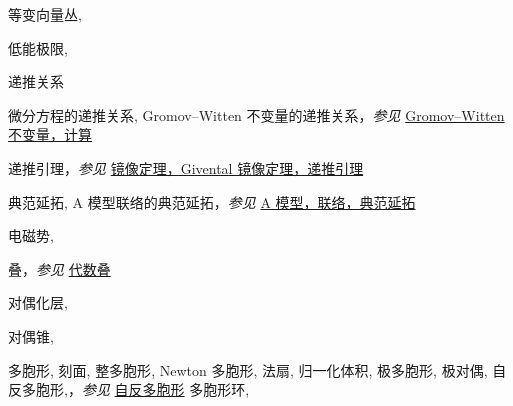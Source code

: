 \begin{theindex}
\item \leavevmode\hypertarget{idx:0255}{等变向量丛},\enspace{}
\indexspace
\item \leavevmode\hypertarget{idx:0745}{低能极限},\enspace{}
\indexspace
\item \leavevmode\hypertarget{idx:1210}{递推关系}
\subitem \leavevmode\hypertarget{idx:1211}{微分方程的递推关系},\enspace{}
\subitem \leavevmode\hypertarget{idx:1212}{Gromov--Witten 不变量的递推关系}，\textit{参见} \hyperlink{idx:0523}{Gromov--Witten 不变量，计算}
\indexspace
\item \leavevmode\hypertarget{source:489}{}\hypertarget{idx:1209}{递推引理}，\textit{参见} \hyperlink{idx:0860}{镜像定理，Givental 镜像定理，递推引理}
\indexspace
\item \leavevmode\hypertarget{idx:0112}{典范延拓},\enspace{}
\subitem \leavevmode\hypertarget{idx:0113}{A 模型联络的典范延拓}，\textit{参见} \hyperlink{idx:0005}{A 模型，联络，典范延拓}
\indexspace
\item \leavevmode\hypertarget{idx:0238}{电磁势},\enspace{}
\indexspace
\item \leavevmode\hypertarget{idx:1283}{叠}，\textit{参见} \hyperlink{idx:0040}{代数叠}
\indexspace
\item \leavevmode\hypertarget{idx:0225}{对偶化层},\enspace{}
\indexspace
\item \leavevmode\hypertarget{idx:0224}{对偶锥},\enspace{}
\indexspace
\item \leavevmode\hypertarget{idx:1071}{多胞形},\enspace{}
\subitem \leavevmode\hypertarget{idx:1072}{刻面},\enspace{}
\subitem \leavevmode\hypertarget{idx:1073}{整多胞形},\enspace{}
\subitem \leavevmode\hypertarget{idx:1074}{Newton 多胞形},\enspace{}
\subitem \leavevmode\hypertarget{idx:1075}{法扇},\enspace{}
\subitem \leavevmode\hypertarget{idx:1076}{归一化体积},\enspace{}
\subitem \leavevmode\hypertarget{idx:1077}{极多胞形},\enspace{}
\subsubitem \leavevmode\hypertarget{idx:1078}{极对偶},\enspace{}
\subitem \leavevmode\hypertarget{idx:1079}{自反多胞形},\enspace{}，\textit{参见} \hyperlink{idx:1218}{自反多胞形}
\subitem \leavevmode\hypertarget{idx:1080}{多胞形环},\enspace{}

\end{theindex}
